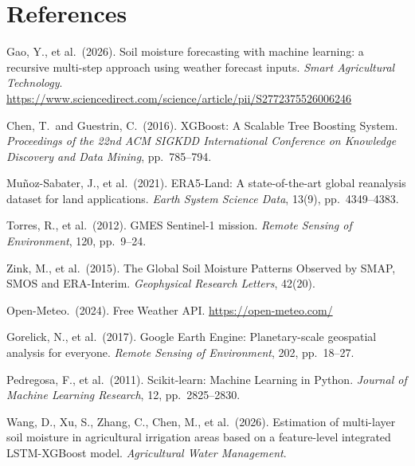 \documentclass[12pt, a4paper]{article}
\begin{document}

\section*{References}

\begin{enumerate}[label={[\arabic*]}]
    \item Gao, Y., et al.\ (2026). Soil moisture forecasting with machine learning: a recursive multi-step approach using weather forecast inputs. \textit{Smart Agricultural Technology}. \url{https://www.sciencedirect.com/science/article/pii/S2772375526006246}

    \item Chen, T.\ and Guestrin, C.\ (2016). XGBoost: A Scalable Tree Boosting System. \textit{Proceedings of the 22nd ACM SIGKDD International Conference on Knowledge Discovery and Data Mining}, pp.\ 785--794.

    \item Muñoz-Sabater, J., et al.\ (2021). ERA5-Land: A state-of-the-art global reanalysis dataset for land applications. \textit{Earth System Science Data}, 13(9), pp.\ 4349--4383.

    \item Torres, R., et al.\ (2012). GMES Sentinel-1 mission. \textit{Remote Sensing of Environment}, 120, pp.\ 9--24.

    \item Zink, M., et al.\ (2015). The Global Soil Moisture Patterns Observed by SMAP, SMOS and ERA-Interim. \textit{Geophysical Research Letters}, 42(20).

    \item Open-Meteo.\ (2024). Free Weather API. \url{https://open-meteo.com/}

    \item Gorelick, N., et al.\ (2017). Google Earth Engine: Planetary-scale geospatial analysis for everyone. \textit{Remote Sensing of Environment}, 202, pp.\ 18--27.

    \item Pedregosa, F., et al.\ (2011). Scikit-learn: Machine Learning in Python. \textit{Journal of Machine Learning Research}, 12, pp.\ 2825--2830.
    
    \item Wang, D., Xu, S., Zhang, C., Chen, M., et al.\ (2026). Estimation of multi-layer soil moisture in agricultural irrigation areas based on a feature-level integrated LSTM-XGBoost model. \textit{Agricultural Water Management}.
\end{enumerate}
\end{document}
